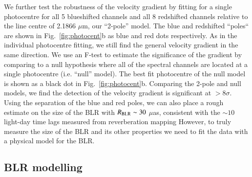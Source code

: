 \documentclass[longauth,]{aa}
\newcommand{\micron}{{\mbox{$\mu$m}}}
\newcommand{\uas}{{\mbox{$\mu$as}}}
\begin{document}
We further test the robustness of the velocity gradient by fitting for a single photocentre for all 5 blueshifted channels and all 8 redshifted channels relative to the line centre of 2.1866 \micron, our ``2-pole'' model. The blue and redshifted ``poles`` are shown in Fig.~\ref{fig:photocent}b as blue and red dots respectively. As in the individual photocentre fitting, we still find the general velocity gradient in the same direction. We use an F-test to estimate the significance of the gradient by comparing to a null hypothesis where all of the spectral channels are located at a single photocentre (i.e. 
``null'' model). The best fit photocentre of the null model is shown as a black dot in Fig.~\ref{fig:photocent}b. Comparing the 2-pole and null models, we find the detection of the velocity gradient is significant at $>8\sigma$. Using the separation of the blue and red poles, we can also place a rough estimate on the size of the BLR with $R_{\rm BLR} \sim 30$ \uas, consistent with the $\sim10$ light-day time lags measured from reverberation mapping \citep{Stirpe:1994aa,Onken:2002aa,Peterson:2004aa,Zu:2011aa} However, to truly measure the size of the BLR and its other properties we need to fit the data with a physical model for the BLR. 

\subsection{BLR modelling}\label{sec:blr_model}
\end{document}
